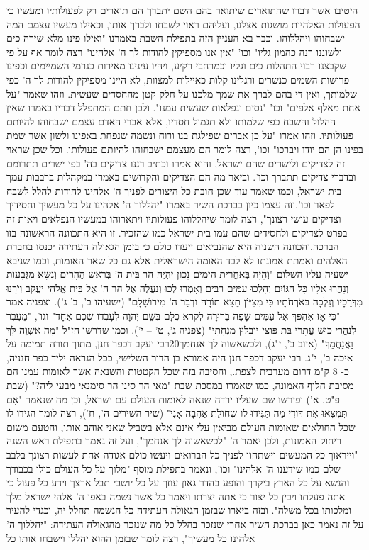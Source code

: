 \documentclass[12pt, openany]{book}
\begin{document}
היטיבו אשר דברו שהתוארים שיתואר בהם השם יתברך הם תוארים רק לפעולותיו ומעשיו כי הפעולות האלהיות מושגות אצלנו, ועליהם ראוי לשבחו ולברך אותו, וכאילו מעשיו עצמם המה ישבחוהו ויהללוהו. וכבר בא העניין הזה בתפילת השבת באמרנו "ואילו פינו מלא שירה כים ולשוננו רנה כהמון גליו" וכו' "אין אנו מספיקין להודות לך ה' אלהינו" רצה לומר אף על פי שקבצנו רבוי התהלות כים וגליו וכמרחבי רקיע, ויהיו עינינו מאירות כגרמי השמיימים וכפינו פרושות השמים כנשרים ורגלינו קלות כאיילות למצוות, לא היינו מספיקין להודות לך ה' כפי שלמותך, ואין די בהם לברך את שמך מלכנו על חלק קטן מהחסדים שעשית. וזהו שאמר "על אחת מאלף אלפים" וכו' "נסים ונפלאות שעשית עמנו". ולכן חתם המתפלל דבריו באמרו שאין ההלול והשבח כפי שלמותו ולא תגמול חסדיו, אלא אברי האדם עצמם ישבחוהו להיותם פעולותיו. וזהו אמרו "על כן אברים שפילגת בנו ורוח ונשמה שנפחת באפינו ולשון אשר שמת בפינו הן הם יודו ויברכו" וכו', רצה לומר הם מעצמם ישבחוהו להיותם פעולותו. וכל שכן שראוי זה לצדיקים ולישרים שהם ישראל, והוא אמרו וכתיב רננו צדיקים בה' בפי ישרים תתרומם ובדברי צדיקים תתברך וכו'. וביאר מה הם הצדיקים והקדושים באמרו במקהלות ברבבות עמך בית ישראל, וכמו שאמר עוד שכן חובת כל היצורים לפניך ה' אלהינו להודות להלל לשבח לפאר וכו'.וזה עצמו כיון בברכת השיר באמרו "יהללוך ה' אלהינו על כל מעשיך וחסידיך וצדיקים עושי רצונך", רצה לומר שיהללוהו פעולותיו ויתארוהו במעשיו הנפלאים ויאות זה בפרט לצדיקים ולחסידים שהם עמו בית ישראל כמו שהזכיר. זו היא התכוונה הראשונה בזו הברכה.והכוונה השניה היא שהנביאים ייעדו כולם כי בזמן הגאולה העתידה יכנסו בחברת האלהים ואמתת אמונתו לא לבד האומה הישראלית אלא גם כל שאר האומות, וכמו שניבא ישעיה עליו השלום "וְהָיָה בְּאַחֲרִית הַיָּמִים נָכוֹן יִהְיֶה הַר בֵּית ה' בְּרֹאשׁ הֶהָרִים וְנִשָּׂא מִגְּבָעוֹת וְנָהֲרוּ אֵלָיו כָּל הַגּוֹיִם וְהָלְכוּ עַמִּים רַבִּים וְאָמְרוּ לְכוּ וְנַעֲלֶה אֶל הַר ה' אֶל בֵּית אֱלֹהֵי יַעֲקֹב וְיֹרֵנוּ מִדְּרָכָיו וְנֵלְכָה בְּאֹרְחֹתָיו כִּי מִצִּיּוֹן תֵּצֵא תוֹרָה וּדְבַר ה' מִירוּשָׁלָ‍ִם" (ישעיהו ב', ב'  ג'). וצפניה אמר "כִּי אָז אֶהְפֹּךְ אֶל עַמִּים שָׂפָה בְרוּרָה לִקְרֹא כֻלָּם בְּשֵׁם יְהוָה לְעָבְדוֹ שְׁכֶם אֶחָד" וגו', "מֵעֵבֶר לְנַהֲרֵי כוּשׁ עֲתָרַי בַּת פּוּצַי יוֹבִלוּן מִנְחָתִי" (צפניה ג', ט' – י'). וכמו שדרשו חז"ל "מָה אַשְׁוֶה לָּךְ וַאֲנַחֲמֵךְ" (איוב ב', י"ג), ולכשאשוה לך אנחמך20רבי יעקב דכפר חנן, מתוך תורה תמימה על איכה ב', י"ג. רבי יעקב דכפר חנן היה אמורא בן הדור השלישי, ככל הנראה יליד כפר חנניה, כ- 8 ק"מ דרום מערבית לצפת., והסיבה בזה שכל הקטטות והשנאה אשר לאומות עמנו הם מסיבת חלוף האמונה, כמו שאמרו במסכת שבת "מאי הר סיני הר סימנאי מבעי ליה?" (שבת פ"ט, א') ופירשו שם שעליו ירדה שנאה לאומות העולם עם ישראל, וכן מה שנאמר "אִם תִּמְצְאוּ אֶת דּוֹדִי מַה תַּגִּידוּ לוֹ שֶׁחוֹלַת אַהֲבָה אָנִי" (שיר השירים ה', ח'), רצה לומר  הגידו לו שכל החולאים שאומות העולם מביאין עלי אינם אלא בשביל שאני אוהב אותו, והטעם משום ריחוק האמונות, ולכן יאמר ה' "לכשאשוה לך אנחמך", ועל זה נאמר בתפילת ראש השנה "וייראוך כל המעשים וישתחוו לפניך כל הברואים ויעשו כולם אגודה אחת לעשות רצונך בלבב שלם כמו שידענו ה' אלהינו" וכו', ונאמר בתפילת מוסף "מלוך על כל העולם כולו בכבודך והנשא על כל הארץ ביקרך והופע בהדר גאון עוזך על כל יושבי תבל ארצך וידע כל פעול כי אתה פעלתו ויבין כל יצור כי אתה יצרתו ויאמר כל אשר נשמה באפו ה' אלהי ישראל מלך ומלכותו בכל משלה". ובזה ביארו שבזמן הגאולה העתידה כל הנשמה תהלל יה, וכגדי להעיר על זה נאמר כאן בברכת השיר אחרי שנזכר בהלל כל מה שנזכר מהגאולה העתידה: "יהללוך ה' אלהינו כל מעשיך", רצה לומר שבזמן ההוא יהללו וישבחו אותו כל 
\end{document}

